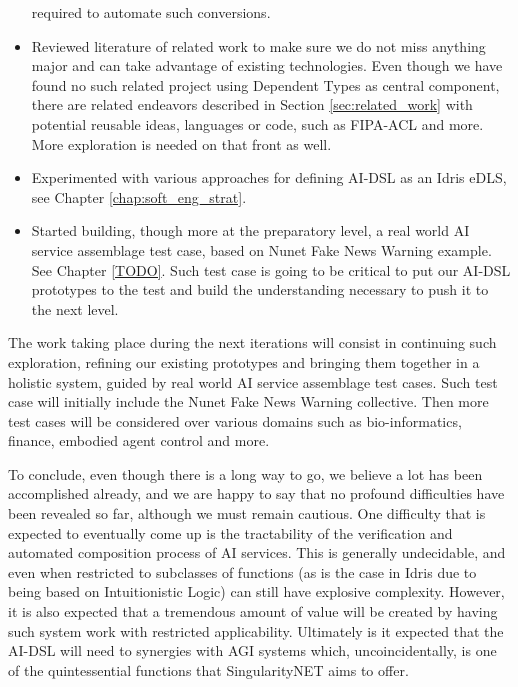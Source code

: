 \documentclass[]{report}
\begin{document}
\begin{itemize}
  required to automate such conversions.
\item Reviewed literature of related work to make sure we do not miss
  anything major and can take advantage of existing technologies.
  Even though we have found no such related project using Dependent
  Types as central component, there are related endeavors described in Section
  \ref{sec:related_work} with potential reusable ideas, languages or code,
  such as FIPA-ACL and more.  More exploration is needed on that front
  as well.
\item Experimented with various approaches for defining AI-DSL as an
  Idris eDLS, see Chapter \ref{chap:soft_eng_strat}.
\item Started building, though more at the preparatory level, a real
  world AI service assemblage test case, based on Nunet Fake News
  Warning example.  See Chapter \ref{TODO}.  Such test case is going
  to be critical to put our AI-DSL prototypes to the test and build
  the understanding necessary to push it to the next level.
\end{itemize}
The work taking place during the next iterations will consist in
continuing such exploration, refining our existing prototypes and
bringing them together in a holistic system, guided by real world AI
service assemblage test cases.  Such test case will initially include
the Nunet Fake News Warning collective.  Then more test cases will be
considered over various domains such as bio-informatics, finance,
embodied agent control and more.

To conclude, even though there is a long way to go, we believe a lot
has been accomplished already, and we are happy to say that no
profound difficulties have been revealed so far, although we must
remain cautious.  One difficulty that is expected to eventually come
up is the tractability of the verification and automated composition
process of AI services.  This is generally undecidable, and even when
restricted to subclasses of functions (as is the case in Idris due to
being based on Intuitionistic Logic) can still have explosive
complexity.  However, it is also expected that a tremendous amount of
value will be created by having such system work with restricted
applicability.  Ultimately is it expected that the AI-DSL will need to
synergies with AGI systems which, uncoincidentally, is one of the
quintessential functions that SingularityNET aims to offer.

\appendix
\end{document}
